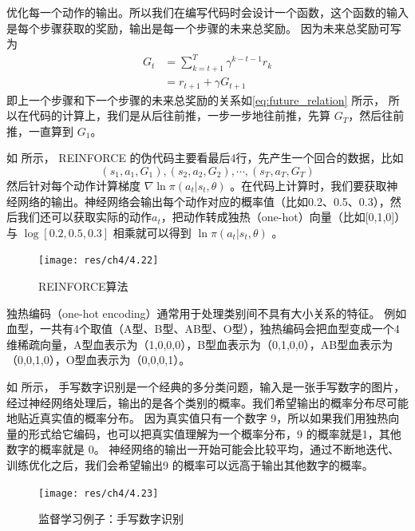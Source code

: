 优化每一个动作的输出。所以我们在编写代码时会设计一个函数，这个函数的输入是每个步骤获取的奖励，输出是每一个步骤的未来总奖励。
因为未来总奖励可写为
\begin{equation}
    \label{eq:future_relation}
    \begin{aligned}
        G_{t} &=\sum_{k=t+1}^{T} \gamma^{k-t-1} r_{k} \\
        &=r_{t+1}+\gamma G_{t+1}
        \end{aligned}
\end{equation}
即上一个步骤和下一个步骤的未来总奖励的关系如\eqref{eq:future_relation} 所示，
所以在代码的计算上，我们是从后往前推，一步一步地往前推，先算 $G_T$，然后往前推，一直算到 $G_1$。

如 所示，
REINFORCE 的伪代码主要看最后4行，先产生一个回合的数据，比如 
$$
(s_1,a_1,G_1),(s_2,a_2,G_2),\cdots,(s_T,a_T,G_T)
$$
然后针对每个动作计算梯度 $\nabla \ln \pi(a_t|s_t,\theta)$ 。在代码上计算时，我们要获取神经网络的输出。神经网络会输出每个动作对应的概率值（比如0.2、0.5、0.3），然后我们还可以获取实际的动作$a_t$，把动作转成独热（one-hot）向量（比如[0,1,0]）与 $\log [0.2,0.5,0.3]$ 相乘就可以得到 $\ln \pi(a_t|s_t,\theta)$  。
\begin{figure}[hbt]
    \centering
    \texttt{[image: res/ch4/4.22]}
    \caption{REINFORCE算法}
    \label{fig:fig4.22}
\end{figure}

\begin{tcolorbox}[colframe=blue!25,colback=blue!10]
独热编码（one-hot encoding）通常用于处理类别间不具有大小关系的特征。 例如血型，一共有4个取值（A型、B型、AB型、O型），独热编码会把血型变成一个4维稀疏向量，A型血表示为（1,0,0,0），B型血表示为（0,1,0,0），AB型血表示为（0,0,1,0），O型血表示为（0,0,0,1）。
\end{tcolorbox}

如 所示，
手写数字识别是一个经典的多分类问题，输入是一张手写数字的图片，经过神经网络处理后，输出的是各个类别的概率。我们希望输出的概率分布尽可能地贴近真实值的概率分布。
因为真实值只有一个数字 9，所以如果我们用独热向量的形式给它编码，也可以把真实值理解为一个概率分布，9 的概率就是1，其他数字的概率就是 0。
神经网络的输出一开始可能会比较平均，通过不断地迭代、训练优化之后，我们会希望输出9 的概率可以远高于输出其他数字的概率。

\begin{figure}[hbt]
    \centering
    \texttt{[image: res/ch4/4.23]}
    \caption{监督学习例子：手写数字识别}
    \label{fig:fig4.23}
\end{figure}

